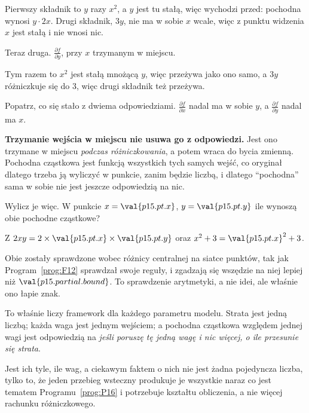 \begin{fr}
Pierwszy składnik to $y$ razy $x^{2}$, a $y$ jest tu stałą, więc wychodzi
przed: pochodna wynosi $y \cdot 2x$. Drugi składnik, $3y$, nie ma w sobie $x$
wcale, więc z punktu widzenia $x$ jest stałą i nie wnosi nic.

Teraz druga. $\frac{\partial f}{\partial y}$, przy $x$ trzymanym w miejscu.
\nextframe
\end{fr}

\begin{fr}
Tym razem to $x^{2}$ jest stałą mnożącą $y$, więc przeżywa jako ono samo, a
$3y$ różniczkuje się do $3$, więc drugi składnik też przeżywa.

\begin{trapbox}
Popatrz, co się stało z dwiema odpowiedziami.
$\frac{\partial f}{\partial x}$ nadal ma w sobie $y$, a
$\frac{\partial f}{\partial y}$ nadal ma $x$.

\textbf{Trzymanie wejścia w miejscu nie usuwa go z odpowiedzi.} Jest ono
trzymane w miejscu \emph{podczas różniczkowania}, a potem wraca do bycia
zmienną. Pochodna cząstkowa jest funkcją wszystkich tych samych wejść, co
oryginał \dash{} dlatego trzeba ją wyliczyć w punkcie, zanim będzie liczbą, i
dlatego \enquote{pochodna} sama w sobie nie jest jeszcze odpowiedzią na nic.
\end{trapbox}
\end{fr}

\begin{fr}
Wylicz je więc. W punkcie $x = \val{p15.pt.x}$, $y = \val{p15.pt.y}$ ile
wynoszą obie pochodne cząstkowe?
\dotline
\nextframe
\end{fr}

\begin{fr}
Z $2xy = 2 \times \val{p15.pt.x} \times \val{p15.pt.y}$ oraz
$x^{2} + 3 = \val{p15.pt.x}^{2} + 3$.

Obie zostały sprawdzone wobec różnicy centralnej na siatce punktów, tak jak
Program~\ref{prog:F12} sprawdzał swoje reguły, i zgadzają się wszędzie na niej
lepiej niż $\val{p15.partial.bound}$. To sprawdzenie arytmetyki, a nie idei,
ale właśnie ono łapie znak.

\begin{aibox}
To właśnie liczy framework dla każdego parametru modelu. Strata jest jedną
liczbą; każda waga jest jednym wejściem; a pochodna cząstkowa względem jednej
wagi jest odpowiedzią na \emph{jeśli poruszę tę jedną wagę i nic więcej, o ile
przesunie się strata}.

Jest ich tyle, ile wag, a ciekawym faktem o nich nie jest żadna pojedyncza
liczba, tylko to, że jeden przebieg wsteczny produkuje je wszystkie naraz
\dash{} co jest tematem Programu~\ref{prog:P16} i potrzebuje kształtu
obliczenia, a nie więcej rachunku różniczkowego.
\end{aibox}
\end{fr}

